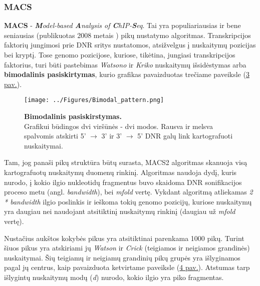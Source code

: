 \documentclass[12pt]{article}
\begin{document}
\subsubsection{MACS}
\textbf{MACS} - \emph{\textbf{M}odel-based \textbf{A}nalysis of
\textbf{C}hIP-\textbf{S}eq}. Tai yra populiariausias ir bene seniausias
(publikuotas 2008 metais \cite{ARTICLE20}) pikų nustatymo algoritmas.
Transkripcijos faktorių jungimosi prie DNR sritys nustatomos, atsižvelgus į
nuskaitymų pozicijas bei kryptį. Tose genomo pozicijose, kuriose, tikėtina,
jungiasi transkripcijos faktorius, turi būti pastebimas \emph{Watsono} ir
\emph{Kriko} nuskaitymų išsidėstymas arba \textbf{bimodalinis pasiskirtymas},
kurio grafikas pavaizduotas trečiame paveiksle (\hyperref[fig:image3]{3 pav.}).

\begin{figure}[ht]
    \begin{center}
        \captionsetup{justification=centering}
        \texttt{[image: ../Figures/Bimodal\_pattern.png]}
        \vspace{-1\baselineskip}
        \caption{\small\textbf{Bimodalinis pasiskirstymas.}\\Grafikui
            būdingos dvi viršūnės - dvi modos. Rausva ir melsva spalvomis
            atskirti 5' \(\rightarrow\) 3' ir 3' \(\rightarrow\) 5'
            DNR galų link kartografuoti nuskaitymai.}
        \label{fig:image3}
    \end{center}
\end{figure}

Tam, jog panaši pikų struktūra būtų surasta, MACS2 algoritmas skanuoja visą
kartografuotų nuskaitymų duomenų rinkinį. Algoritmas naudoja dydį, kuris nurodo,
į kokio ilgio nukleotidų fragmentus buvo skaidoma DNR sonifikacijos proceso
metu (angl. \emph{bandwidth}), bei \emph{mfold} vertę. Vykdant algoritmą
atliekamas \emph{2 * bandwidth} ilgio poslinkis ir ieškoma tokių genomo
pozicijų, kuriose nuskaitymų yra daugiau nei naudojant atsitiktinį nuskaitymų
rinkinį (daugiau už \emph{mfold} vertę).

Nustačius aukštos kokybės pikus yra atsitiktinai parenkama 1000 pikų. Turint
šiuos pikus yra atskiriami jų \emph{Watson} ir \emph{Crick} (teigiamos ir
neigiamos grandinės) nuskaitymai.
Šių teigiamų ir neigiamų grandinių pikų grupės yra išlyginamos pagal jų
centrus, kaip pavaizduota ketvirtame paveiksle (\hyperref[fig:image4]{4 pav.}).
Atstumas tarp išlygintų nuskaitymų modų (\emph{d}) nurodo, kokio ilgio yra piko
fragmentas.
\end{document}

